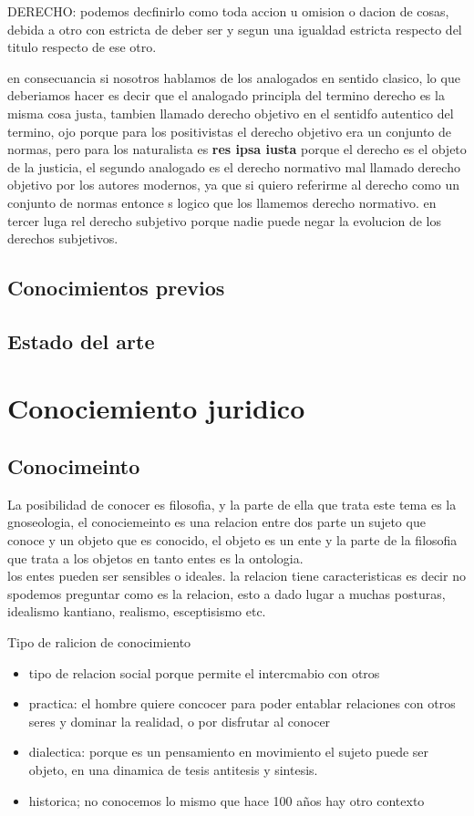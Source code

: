 \documentclass[12pt]{book}
\begin{document}
DERECHO: podemos decfinirlo como toda accion u omision o dacion de cosas, debida a otro con estricta de deber ser y segun una igualdad estricta respecto del titulo respecto de ese otro.

en consecuancia si nosotros hablamos de los analogados en sentido clasico, lo que deberiamos hacer es decir que el analogado principla del termino derecho es la misma cosa justa, tambien llamado derecho objetivo en el sentidfo autentico del termino, ojo porque para los positivistas el derecho objetivo era un conjunto de normas, pero para los naturalista es \textbf{res ipsa iusta }porque el derecho es el objeto de la justicia, el segundo analogado es el derecho normativo mal llamado derecho objetivo por los autores modernos, ya que si quiero referirme al derecho como un conjunto de normas entonce s logico que los llamemos derecho normativo.
en tercer luga rel derecho subjetivo porque nadie puede negar la evolucion de los derechos subjetivos.




\section{Conocimientos previos}
\section{Estado del arte}

\chapter{Conociemiento juridico}
\section{Conocimeinto}
La posibilidad de conocer es filosofia, y la parte de ella que trata este tema es la gnoseologia, el conociemeinto es una relacion entre dos parte un sujeto que conoce y un objeto que es conocido, el objeto es un ente y la parte de la filosofia que trata a los objetos en tanto entes es la ontologia.
\\
los entes pueden ser sensibles o ideales.
la relacion tiene caracteristicas es decir no spodemos preguntar como es la relacion, esto a dado lugar a muchas posturas, idealismo kantiano, realismo, esceptisismo etc.

Tipo de ralicion de conocimiento
\begin{itemize}
\item tipo de relacion social porque permite el intercmabio con otros
\item practica: el hombre quiere concocer para poder entablar relaciones con otros seres y dominar la realidad, o por disfrutar al conocer
\item dialectica: porque es un pensamiento en movimiento el sujeto puede ser objeto, en una dinamica de tesis antitesis y sintesis.
\item historica; no conocemos lo mismo que hace 100 años hay otro contexto
\end{itemize}
\end{document}
